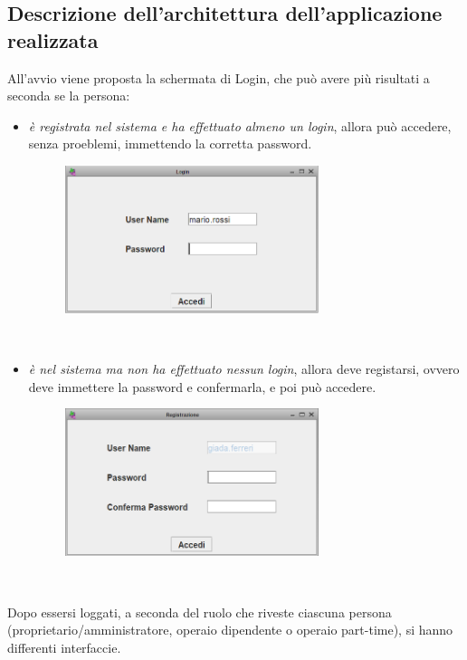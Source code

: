\documentclass{article}
\begin{document}
\subsection{Descrizione dell'architettura dell'applicazione realizzata}
All’avvio viene proposta la schermata di Login, che può avere più risultati a seconda se la persona:
\begin{itemize}
\item  \textit{è registrata nel sistema e ha effettuato almeno un login}, allora può accedere, senza proeblemi, immettendo la corretta password.
\begin{figure}[htbp]
\centering
\includegraphics[width=0.7\textwidth]{img/rec_system.png}
\end{figure}\\\newline\newline
\item   \textit{è nel sistema ma non ha effettuato nessun login}, allora deve registarsi, ovvero deve immettere la password e confermarla, e poi può accedere.
\begin{figure}[htbp]
\centering
\includegraphics[width=0.7\textwidth]{img/rec_passw.png}
\end{figure}\\\newline\newline
\end{itemize}
\newpage
Dopo essersi loggati, a seconda del ruolo che riveste ciascuna persona (proprietario/amministratore, operaio dipendente o operaio part-time), si hanno differenti interfaccie.\\
\end{document}

